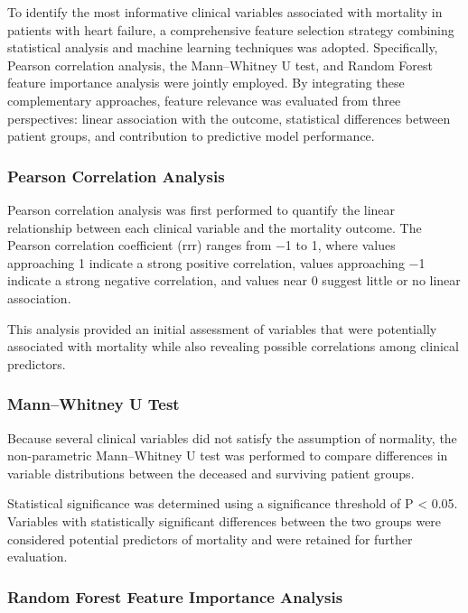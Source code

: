 \documentclass[12pt]{article}
\begin{document}
To identify the most informative clinical variables associated with mortality in patients with heart failure, a comprehensive feature selection strategy combining statistical analysis and machine learning techniques was adopted. Specifically, Pearson correlation analysis, the Mann–Whitney U test, and Random Forest feature importance analysis were jointly employed. By integrating these complementary approaches, feature relevance was evaluated from three perspectives: linear association with the outcome, statistical differences between patient groups, and contribution to predictive model performance. 

\subsubsection{Pearson Correlation Analysis}

Pearson correlation analysis was first performed to quantify the linear relationship between each clinical variable and the mortality outcome. The Pearson correlation coefficient (rrr) ranges from −1 to 1, where values approaching 1 indicate a strong positive correlation, values approaching −1 indicate a strong negative correlation, and values near 0 suggest little or no linear association.

This analysis provided an initial assessment of variables that were potentially associated with mortality while also revealing possible correlations among clinical predictors. 

\subsubsection{Mann–Whitney U Test}

Because several clinical variables did not satisfy the assumption of normality, the non-parametric Mann–Whitney U test was performed to compare differences in variable distributions between the deceased and surviving patient groups.

Statistical significance was determined using a significance threshold of P < 0.05. Variables with statistically significant differences between the two groups were considered potential predictors of mortality and were retained for further evaluation. 

\subsubsection{Random Forest Feature Importance Analysis}
\end{document}
